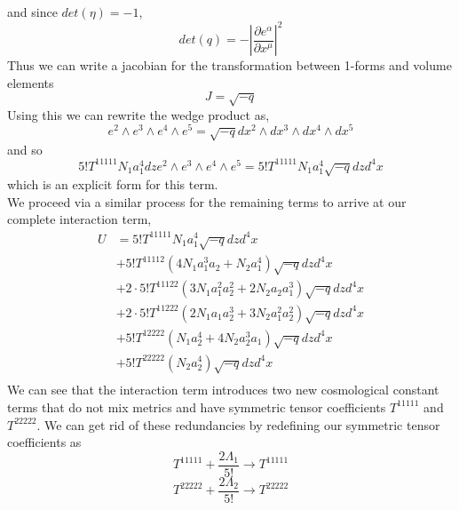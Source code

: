 \documentclass[11pt]{report}
\numberwithin{equation}{chapter}
\begin{document}
and since $det\left(\eta\right)=-1$,
\begin{equation}
    det\left(q\right)=-\left|\frac{\partial e^\alpha}{\partial x^\mu}\right|^2
\end{equation}
Thus we can write a jacobian for the transformation between 1-forms and volume elements
\begin{equation}
    J=\sqrt{-q}
\end{equation}
Using this we can rewrite the wedge product as, 
\begin{equation}
    e^{2}\wedge e^{3}\wedge e^{4}\wedge e^{5}=\sqrt{-q}dx^{2}\wedge dx^{3}\wedge dx^{4}\wedge dx^{5}
\end{equation}
and so
\begin{equation}
    5!T^{11111}N_1a_1^4dze^{2}\wedge e^{3}\wedge e^{4}\wedge e^{5}=5!T^{11111}N_1a_1^4\sqrt{-q}dzd^4x
\end{equation}
which is an explicit form for this term.\\
We proceed via a similar process for the remaining terms to arrive at our complete interaction term,
\begin{align}
    U&=5!T^{11111}N_1a_1^4\sqrt{-q}dzd^4x\\ \nonumber
     &+5!T^{11112}\left(4N_1a_1^3a_2+N_2a_1^4\right)\sqrt{-q}dzd^4x\\ \nonumber
     &+2\cdot5!T^{11122}\left(3N_1a_1^2a_2^2+2N_2a_2a_1^3\right)\sqrt{-q}dzd^4x\\ \nonumber
     &+2\cdot5!T^{11222}\left(2N_1a_1a^3_2+3N_2a_1^2a_2^2\right)\sqrt{-q}dzd^4x\\ \nonumber
     &+5!T^{12222}\left(N_1a_2^4+4N_2a_2^3a_1\right)\sqrt{-q}dzd^4x\\ \nonumber
     &+5!T^{22222}\left(N_2a_2^4\right)\sqrt{-q}dzd^4x\\ \nonumber
\end{align}
We can see that the interaction term introduces two new cosmological constant terms that do not mix metrics and have symmetric tensor coefficients $T^{11111}$  and $T^{22222}$. We can get rid of these redundancies by redefining our symmetric tensor coefficients as
\begin{equation}
    T^{11111}+\frac{2\Lambda_1}{5!} \longrightarrow T^{11111}
\end{equation}
\begin{equation}
    T^{22222}+\frac{2\Lambda_2}{5!} \longrightarrow T^{22222}
\end{equation}
\end{document}
